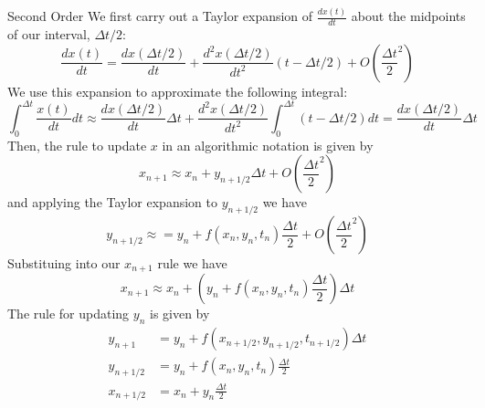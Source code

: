 \documentclass[12pt]{report}
\begin{document}
\begin{proc}{Second Order}{}
        We first carry out a Taylor expansion of $\frac{dx(t)}{dt}$ about the midpoints of our interval, $\Delta t/2$: \begin{equation}
                \frac{dx(t)}{dt} = \frac{dx(\Delta t/2)}{dt} + \frac{d^2x(\Delta t/2)}{dt^2}(t - \Delta t/2) + O\left(\frac{\Delta t}{2}^2\right)
        \end{equation}
        We use this expansion to approximate the following integral:\begin{equation}
                \int_{0}^{\Delta t}\frac{x(t)}{dt}dt \approx \frac{dx(\Delta t/2)}{dt}\Delta t + \frac{d^2x(\Delta t/2)}{dt^2}\int_{0}^{\Delta t}(t-\Delta t/2)dt = \frac{dx(\Delta t/2)}{dt}\Delta t
        \end{equation}
        Then, the rule to update $x$ in an algorithmic notation is given by \begin{equation}
                x_{n+1} \approx x_n + y_{n+1/2}\Delta t + O\left(\frac{\Delta t}{2}^2\right)
        \end{equation}
        and applying the Taylor expansion to $y_{n+1/2}$ we have \begin{equation}
                y_{n+1/2} \approx = y_n + f(x_n,y_n,t_n)\frac{\Delta t}{2} + O\left(\frac{\Delta t}{2}^2\right)
        \end{equation}
        Substituing into our $x_{n+1}$ rule we have \begin{equation}
                x_{n+1} \approx x_n + \left( y_n + f(x_n,y_n,t_n)\frac{\Delta t}{2}\right)\Delta t
        \end{equation}
        The rule for updating $y_n$ is given by \begin{align}
                y_{n+1} &= y_n + f(x_{n+1/2},y_{n+1/2},t_{n+1/2})\Delta t \\
                y_{n+1/2} &= y_n + f(x_n,y_n,t_n)\frac{\Delta t}{2} \\
                x_{n+1/2} &= x_n + y_n\frac{\Delta t}{2} 
        \end{align}
\end{proc}
\end{document}
